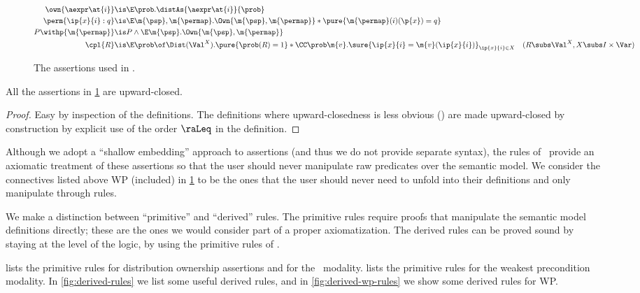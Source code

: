 \documentclass[acmsmall,nonacm,screen,appendix]{acmart}
\begin{document}
\begin{figure}[h]
\begin{align*}
    \\
    \own{\aexpr\at{i}} &\is
      \E \prob. \distAs{\aexpr\at{i}}{\prob}
    \\
    \perm{\ip{x}{i}:q} &\is
      \E\m{\psp},\m{\permap}.
        \Own{\m{\psp},\m{\permap}}
        * \pure{\m{\permap}(i)(\p{x}) = q}
    \\
    P\withp{\m{\permap}} &\is
      P \land \E\m{\psp}.\Own{\m{\psp}, \m{\permap}}
    \\
    \cpl{R} &\is
      \E \prob \of \Dist(\Val^{X}).
        \pure{\prob(R) = 1} *
        \CC\prob \m{v}.
          \sure{\ip{x}{i} = \m{v}(\ip{x}{i})}_{\ip{x}{i}\in X}
    & (R \subs \Val^{X}, X \subs I \times \Var)
  \end{align*}
\caption{The assertions used in \thelogic.}
\label{fig:assertions}
\end{figure}

\begin{proposition}
  All the assertions in \cref{fig:assertions} are upward-closed.
\end{proposition}
\begin{proof}
  Easy by inspection of the definitions.
  The definitions where upward-closedness is less obvious
  (\eg \supercond)
  are made upward-closed by construction by explicit use of
  the order $\raLeq$ in the definition.
\end{proof}

Although we adopt a ``shallow embedding'' approach to assertions
(and thus we do not provide separate syntax),
the rules of \thelogic\ provide an axiomatic treatment
of these assertions so that the user should never manipulate raw predicates
over the semantic model.
We consider the connectives listed above WP
(included) in \cref{fig:assertions} to be the ones that the user
should never need to unfold into their definitions and only manipulate
through rules.

We make a distinction between
``primitive'' and ``derived'' rules.
The primitive rules require proofs that manipulate the semantic model definitions directly; these are the ones we would consider part of a proper axiomatization.
The derived rules can be proved sound by staying at the level of the logic,
\ie by using the primitive rules of \thelogic.

 lists the primitive rules for distribution ownership assertions and for the \supercond\ modality.
 lists the primitive rules for the weakest precondition modality.
In \cref{fig:derived-rules} we list some useful derived rules,
and in \cref{fig:derived-wp-rules} we show some derived rules for WP.
\end{document}
